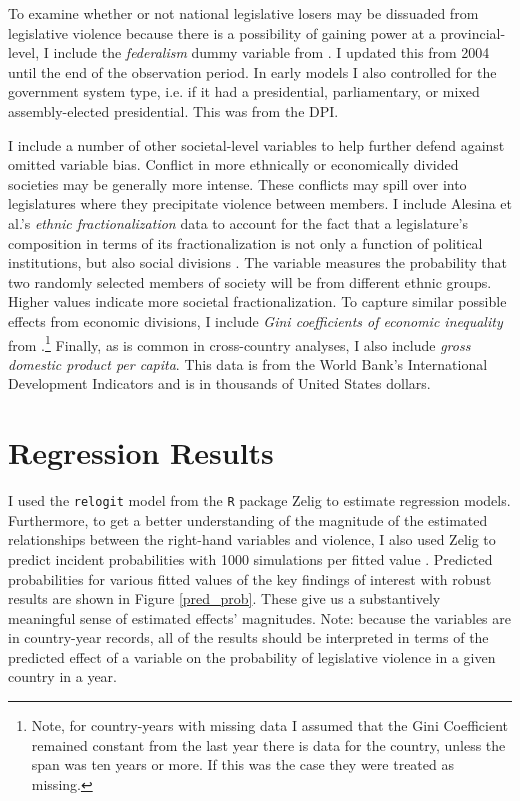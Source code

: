 \documentclass[a4paper]{article}\usepackage[]{graphicx}\usepackage[]{color}
\begin{document}
To examine whether or not national legislative losers may be dissuaded from legislative violence because there is a possibility of gaining power at a provincial-level, I include the \emph{federalism} dummy variable from \cite{Carey2011}. I updated this from 2004 until the end of the observation period. In early models I also controlled for the government system type, i.e. if it had a presidential, parliamentary, or mixed assembly-elected presidential. This was from the DPI.

I include a number of other societal-level variables to help further defend against omitted variable bias. Conflict in more ethnically or economically divided societies may be generally more intense. These conflicts may spill over into legislatures where they precipitate violence between members. I include Alesina et al.'s \citeyearpar{Alesina2003} {\emph{ethnic fractionalization}} data to account for the fact that a legislature's composition in terms of its fractionalization is not only a function of political institutions, but also social divisions \citep{Neto1997, Mozaffar2003}. The variable measures the probability that two randomly selected members of society will be from different ethnic groups. Higher values indicate more societal fractionalization. To capture similar possible effects from economic divisions, I include {\emph{Gini coefficients of economic inequality}} from \cite{UNU2008}.\footnote{Note, for country-years with missing data I assumed that the Gini Coefficient remained constant from the last year there is data for the country, unless the span was ten years or more. If this was the case they were treated as missing.} Finally, as is common in cross-country analyses, I also include {\emph{gross domestic product per capita}}. This data is from the World Bank's International Development Indicators \citeyearpar{WorldBank2011} and is in thousands of United States dollars.



\section{Regression Results}

I used the {\tt{relogit}} model from the {\tt{R}} package Zelig \citep{IMAIKingZelig2008} to estimate regression models. Furthermore, to get a better understanding of the magnitude of the estimated relationships between the right-hand variables and violence, I also used Zelig to predict incident probabilities with 1000 simulations per fitted value \citep[see][]{King2002}. Predicted probabilities for various fitted values of the key findings of interest with robust results are shown in Figure \ref{pred_prob}. These give us a substantively meaningful sense of estimated effects' magnitudes. Note: because the variables are in country-year records, all of the results should be interpreted in terms of the predicted effect of a variable on the probability of legislative violence in a given country in a year.
\end{document}
